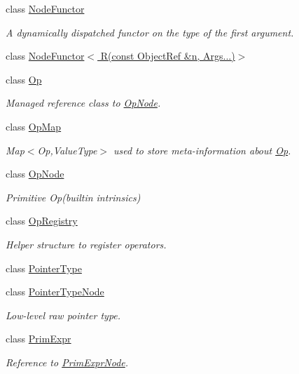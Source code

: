 \begin{DoxyCompactItemize}
class \hyperlink{classtvm_1_1NodeFunctor}{Node\+Functor}
\begin{DoxyCompactList}\small\item\em A dynamically dispatched functor on the type of the first argument. \end{DoxyCompactList}\item 
class \hyperlink{classtvm_1_1NodeFunctor_3_01R_07const_01ObjectRef_01_6n_00_01Args_8_8_8_08_4}{Node\+Functor$<$ R(const Object\+Ref \&n, Args...)$>$}
\item 
class \hyperlink{classtvm_1_1Op}{Op}
\begin{DoxyCompactList}\small\item\em Managed reference class to \hyperlink{classtvm_1_1OpNode}{Op\+Node}. \end{DoxyCompactList}\item 
class \hyperlink{classtvm_1_1OpMap}{Op\+Map}
\begin{DoxyCompactList}\small\item\em Map$<$\+Op,\+Value\+Type$>$ used to store meta-\/information about \hyperlink{classtvm_1_1Op}{Op}. \end{DoxyCompactList}\item 
class \hyperlink{classtvm_1_1OpNode}{Op\+Node}
\begin{DoxyCompactList}\small\item\em Primitive Op(builtin intrinsics) \end{DoxyCompactList}\item 
class \hyperlink{classtvm_1_1OpRegistry}{Op\+Registry}
\begin{DoxyCompactList}\small\item\em Helper structure to register operators. \end{DoxyCompactList}\item 
class \hyperlink{classtvm_1_1PointerType}{Pointer\+Type}
\item 
class \hyperlink{classtvm_1_1PointerTypeNode}{Pointer\+Type\+Node}
\begin{DoxyCompactList}\small\item\em Low-\/level raw pointer type. \end{DoxyCompactList}\item 
class \hyperlink{classtvm_1_1PrimExpr}{Prim\+Expr}
\begin{DoxyCompactList}\small\item\em Reference to \hyperlink{classtvm_1_1PrimExprNode}{Prim\+Expr\+Node}. \end{DoxyCompactList}\item 

\end{DoxyCompactItemize}
